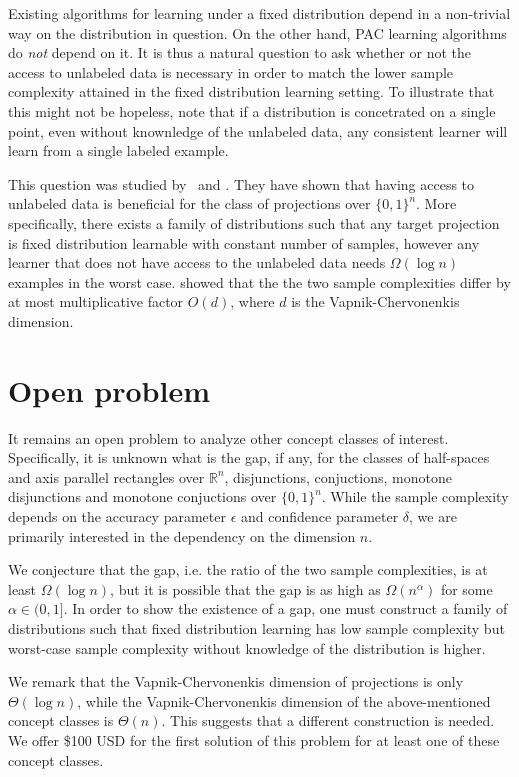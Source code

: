 \documentclass[12pt]{colt2019}
\newcommand{\R}{\mathbb{R}}
\begin{document}
Existing algorithms for learning under a fixed distribution depend in a
non-trivial way on the distribution in question. On the other hand, PAC learning
algorithms do \emph{not} depend on it. It is thus a natural question to ask
whether or not the access to unlabeled data is necessary in order to match the
lower sample complexity attained in the fixed distribution learning setting.
To illustrate that this might not be hopeless, note that if a distribution
is concetrated on a single point, even without knownledge of the unlabeled data, any consistent learner will learn from a single labeled example.

This question was studied by~\cite{Darnstadt-Simon-Szorenyi-2013} and
\cite{Golovnev-Pal-Szorenyi-2019}. They have shown that having access to
unlabeled data is beneficial for the class of projections over $\{0,1\}^n$. More
specifically, there exists a family of distributions such that any target
projection is fixed distribution learnable with constant number of samples,
however any learner that does not have access to the unlabeled data needs
$\Omega(\log n)$ examples in the worst case.
\cite{Darnstadt-Simon-Szorenyi-2013} showed that the the two sample complexities
differ by at most multiplicative factor $O(d)$, where $d$ is the
Vapnik-Chervonenkis dimension.

\section{Open problem}

It remains an open problem to analyze other concept classes of interest.
Specifically, it is unknown what is the gap, if any, for the classes of
half-spaces and axis parallel rectangles over $\R^n$, disjunctions, conjuctions,
monotone disjunctions and monotone conjuctions over $\{0,1\}^n$. While the
sample complexity depends on the accuracy parameter $\epsilon$ and confidence
parameter $\delta$, we are primarily interested in the dependency on the
dimension $n$.

We conjecture that the gap, i.e. the ratio of the two sample complexities, is at
least $\Omega(\log n)$, but it is possible that the gap is as high as
$\Omega(n^\alpha)$ for some $\alpha \in (0,1]$. In order to show the existence
of a gap, one must construct a family of distributions such that fixed
distribution learning has low sample complexity but worst-case sample complexity
without knowledge of the distribution is higher.

We remark that the Vapnik-Chervonenkis dimension of projections is only
$\Theta(\log n)$, while the Vapnik-Chervonenkis dimension of the above-mentioned
concept classes is $\Theta(n)$. This suggests that a different construction is
needed. We offer \$100 USD for the first solution of this problem for at least
one of these concept classes.


\end{document}
